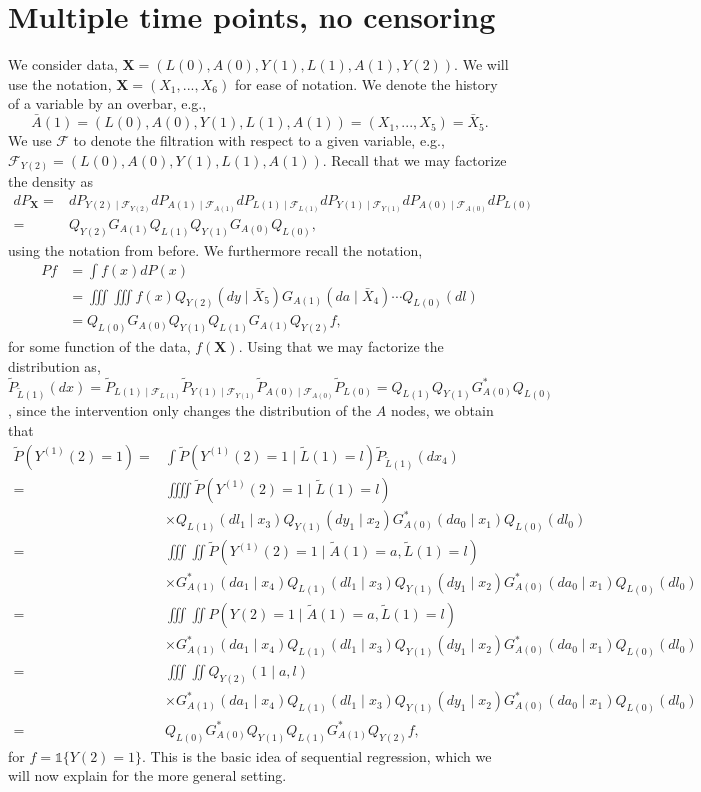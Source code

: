 \documentclass{article}
\newcommand{\A}[1]{A(#1)}
\renewcommand{\L}[1]{L(#1)}
\newcommand{\Y}[1]{Y(#1)}
\newcommand{\Ystar}[2]{Y^{(#1)}(#2)}
\newcommand{\F}[2]{\mathcal{F}_{#1(#2)}}
\newcommand{\Lbar}[1]{\tilde{L}(#1)}
\newcommand{\Abar}[1]{\tilde{A}(#1)}
\begin{document}
\section{Multiple time points, no censoring}
We consider data, $\textbf{X}=(\L{0},\A{0},\Y{1},\L{1},\A{1},\Y{2}).$ We will use the notation, $\textbf{X}=(X_1,...,X_6)$ for ease of notation. We denote the history of a variable by an overbar, e.g., $$\bar{A}(1)=(\L{0},\A{0},\Y{1},\L{1},\A{1})=(X_1,...,X_5)=\bar{X}_5.$$ We use $\mathcal{F}$ to denote the filtration with respect to a given variable, e.g., $\F{Y}{2}=(\L{0},\A{0},\Y{1},\L{1},\A{1})$. Recall that we may factorize the density as 
\begin{align*}
dP_{\textbf{X}}=&dP_{\Y{2}\mid \F{Y}{2}}dP_{\A{1}\mid \F{A}{1}}dP_{\L{1}\mid \F{L}{1}}dP_{\Y{1}\mid \F{Y}{1}}dP_{\A{0}\mid \F{A}{0}}dP_{\L{0}}\\
=&Q_{\Y{2}}G_{\A{1}}Q_{\L{1}}Q_{\Y{1}}G_{\A{0}}Q_{\L{0}},
\end{align*}
using the notation from before. We furthermore recall the notation,
\begin{align*}
    Pf&=\int f(x) dP(x)\\&=\iiint\!\!\!\iiint f(x) Q_{\Y{2}}(dy\mid \bar{X}_5)G_{\A{1}}(da\mid \bar{X}_4)\cdots Q_{\L{0}}(dl)\\&=Q_{\L{0}}G_{\A{0}}Q_{\Y{1}}Q_{\L{1}}G_{\A{1}}Q_{\Y{2}}f,
\end{align*}
for some function of the data, $f(\textbf{X}).$ Using that we may factorize the distribution as, $\tilde{P}_{\Lbar{1}}(dx)=\tilde{P}_{\L{1}\mid \F{L}{1}}\tilde{P}_{\Y{1}\mid \F{Y}{1}}\tilde{P}_{\A{0}\mid \F{A}{0}}\tilde{P}_{\L{0}}=Q_{\L{1}}Q_{\Y{1}}G^*_{\A{0}}Q_{\L{0}}$, since the intervention only changes the distribution of the $A$ nodes, we obtain that
\begin{align*}
    \tilde{P}(\Ystar{1}{2}=1)=&\int\tilde{P}(\Ystar{1}{2}=1\mid\Lbar{1} = l)\tilde{P}_{\Lbar{1}}(dx_4)\\
    =&\iiiint\tilde{P}(\Ystar{1}{2}=1\mid\Lbar{1} = l)\\
    &\times Q_{\L{1}}(dl_1\mid x_3)Q_{\Y{1}}(dy_1\mid x_2)G^*_{\A{0}}(da_0\mid x_1)Q_{\L{0}}(dl_0)\\
    =&\iiint\!\!\!\iint\tilde{P}(\Ystar{1}{2}=1\mid\Abar{1}=a,\Lbar{1} = l)\\
    &\times G^*_{\A{1}}(da_1\mid x_4)Q_{\L{1}}(dl_1\mid x_3)Q_{\Y{1}}(dy_1\mid x_2)G^*_{\A{0}}(da_0\mid x_1)Q_{\L{0}}(dl_0)\\
    =&\iiint\!\!\!\iint P(\Y{2}=1\mid\Abar{1}=a,\Lbar{1} = l)\\
    &\times G^*_{\A{1}}(da_1\mid x_4)Q_{\L{1}}(dl_1\mid x_3)Q_{\Y{1}}(dy_1\mid x_2) G^*_{\A{0}}(da_0\mid x_1)Q_{\L{0}}(dl_0)\\
    =&\iiint\!\!\!\iint  Q_{\Y{2}}(1\mid a, l)\\
    &\times G^*_{\A{1}}(da_1\mid x_4)Q_{\L{1}}(dl_1\mid x_3)Q_{\Y{1}}(dy_1\mid x_2) G^*_{\A{0}}(da_0\mid x_1)Q_{\L{0}}(dl_0)\\
    =&Q_{\L{0}}G^*_{\A{0}}Q_{\Y{1}}Q_{\L{1}}G^*_{\A{1}}Q_{\Y{2}}f,
    \end{align*}
    for $f = \mathds{1}\{\Y{2}=1\}$. This is the basic idea of sequential regression, which we will now explain for the more general setting. 
\end{document}
